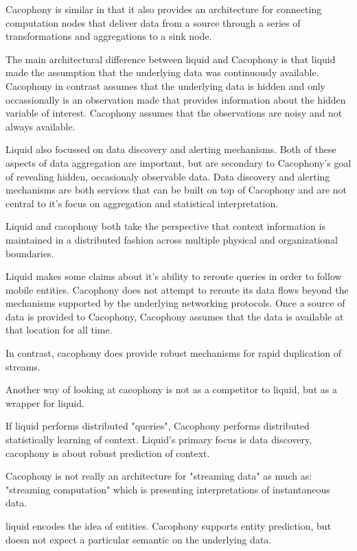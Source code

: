 Cacophony is similar in that it also provides an architecture for connecting
computation nodes that deliver data from a source through a series of
transformations and aggregations to a sink node.

The main architectural difference between liquid and Cacophony is that liquid
made the assumption that the underlying data was continuously available.
Cacophony in contrast assumes that the underlying data is hidden and only
occassionally is an observation made that provides information about the hidden
variable of interest.  Cacophony assumes that the observations are noisy and not
always available.

Liquid also focussed on data discovery and alerting mechanisms.  Both of these
aspects of data aggregation are important, but are secondary to Cacophony's goal
of revealing hidden, occasionaly observable data.  Data discovery and alerting
mechanisms are both services that can be built on top of Cacophony and are not
central to it's focus on aggregation and statistical interpretation. 

Liquid and cacophony both take the perspective that context information is
maintained in a distributed fashion across multiple physical and organizational
boundaries.

Liquid makes some claims about it's ability to reroute queries in order to
follow mobile entities.  Cacophony does not attempt to reroute its data flows
beyond the mechanisms supported by the underlying networking protocols.  Once a
source of data is provided to Cacophony, Cacophony assumes that the data is
available at that location for all time.

In contrast, cacophony does provide robust mechanisms for rapid duplication of
streams.  

Another way of looking at cacophony is not as a competitor to liquid, but as a
wrapper for liquid. 

If liquid performs distributed "queries", Cacophony performs distributed
statistically learning of context.  Liquid's primary focus is data discovery,
cacophony is about robust prediction of context.

Cacophony is not really an architecture for "streaming data" as much as:
"streaming computation" which is presenting interpretations of instantaneous
data.

liquid encodes the idea of entities.  Cacophony supports entity prediction, but
doesn not expect a particular semantic on the underlying data.



